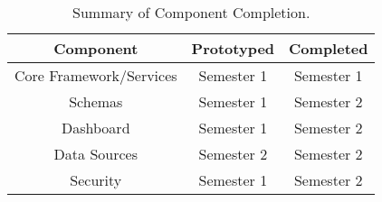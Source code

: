 \begin{table}[H]
\centering
\small
\setlength\tabcolsep{6pt}
 \begin{tabular}{|c|c|c|}
 \hline
 Component & Prototyped & Completed\\
 \hline\hline
 Core Framework/Services & Semester 1 & Semester 1\\ 
 \hline
 Schemas & Semester 1 & Semester 2\\ 
 \hline
 Dashboard & Semester 1 & Semester 2\\ 
 \hline
 Data Sources & Semester 2 & Semester 2\\ 
 \hline
 Security & Semester 1 & Semester 2\\ 
 \hline
\end{tabular}
\caption{Summary of Component Completion.}
\label{table:component:completion}
\end{table}